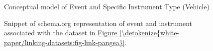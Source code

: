 \documentclass[a4paper,10pt,english]{sphinxmanual}
\begin{document}
\begin{figure}[htbp]
\centering
\capstart

\noindent{}
\caption{Conceptual model of Event and Specific Instrument Type (Vehicle)}\label{\detokenize{white-paper/linking-datasets:id7}}\label{\detokenize{white-paper/linking-datasets:fig-link-model}}\end{figure}

\begin{figure}[htbp]
\centering
\capstart

\noindent{}
\caption{Snippet of schema.org representation of event and instrument
associated with the dataset in \hyperref[\detokenize{white-paper/linking-datasets:fig-link-pangea}]{Figure \ref{\detokenize{white-paper/linking-datasets:fig-link-pangea}}}.}\label{\detokenize{white-paper/linking-datasets:id8}}\label{\detokenize{white-paper/linking-datasets:fig-link-schema-org}}\end{figure}
\end{document}

